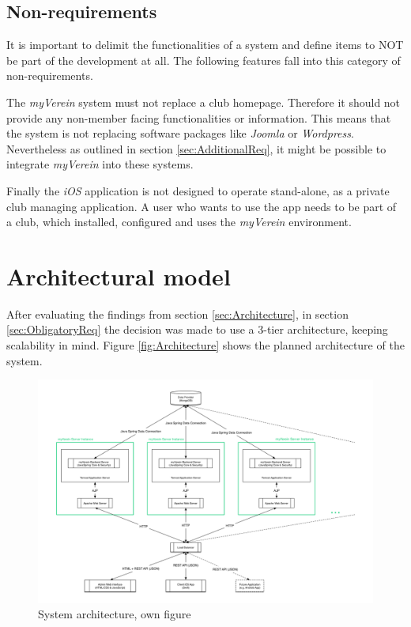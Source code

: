 \subsection{Non-requirements}

It is important to delimit the functionalities of a system and define items to NOT be part of the development at all. The following features fall into this category of non-requirements.

The \emph{myVerein} system must not replace a club homepage. Therefore it should not provide any non-member facing functionalities or information. This means that the system is not replacing software packages like \emph{Joomla} or \emph{Wordpress}. Nevertheless as outlined in section \vref{sec:AdditionalReq}, it might be possible to integrate \emph{myVerein} into these systems.

Finally the \emph{iOS} application is not designed to operate stand-alone, as a private club managing application. A user who wants to use the app needs to be part of a club, which installed, configured and uses the \emph{myVerein} environment.

\section{Architectural model}
\label{sec:ArchitecturalModel}
After evaluating the findings from section \vref{sec:Architecture}, in section \vref{sec:ObligatoryReq} the decision was made to use a 3-tier architecture, keeping scalability in mind. Figure \vref{fig:Architecture} shows the planned architecture of the system. 

\begin{figure}[h]
  	\centering
  	\includegraphics[width=0.95\linewidth]{./images/architecture.png}
  	\caption{System architecture, own figure}
	\label{fig:Architecture}
\end{figure}

